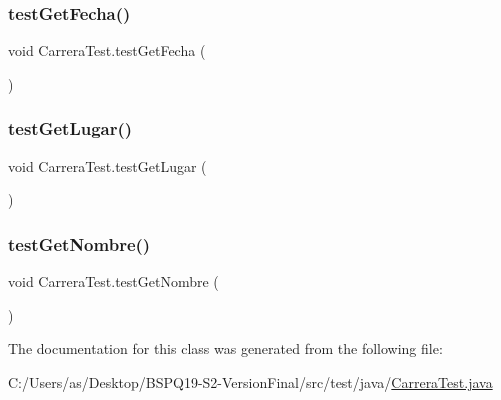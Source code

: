 \mbox{\label{class_carrera_test_a7313b1e9c22029753dd39c7ae4fd5044}} 
\subsubsection{\texorpdfstring{testGetFecha()}{testGetFecha()}}
{\footnotesize\ttfamily void Carrera\+Test.\+test\+Get\+Fecha (\begin{DoxyParamCaption}{ }\end{DoxyParamCaption})}

\mbox{\label{class_carrera_test_a34b8f775dcc547ce1c27af2b07df3b74}} 
\subsubsection{\texorpdfstring{testGetLugar()}{testGetLugar()}}
{\footnotesize\ttfamily void Carrera\+Test.\+test\+Get\+Lugar (\begin{DoxyParamCaption}{ }\end{DoxyParamCaption})}

\mbox{\label{class_carrera_test_aa5f89ec4be4d345d7f2b7331821415cd}} 
\subsubsection{\texorpdfstring{testGetNombre()}{testGetNombre()}}
{\footnotesize\ttfamily void Carrera\+Test.\+test\+Get\+Nombre (\begin{DoxyParamCaption}{ }\end{DoxyParamCaption})}



The documentation for this class was generated from the following file\+:\begin{DoxyCompactItemize}
\item 
C\+:/\+Users/as/\+Desktop/\+B\+S\+P\+Q19-\/\+S2-\/\+Version\+Final/src/test/java/\mbox{\hyperlink{_carrera_test_8java}{Carrera\+Test.\+java}}\end{DoxyCompactItemize}
